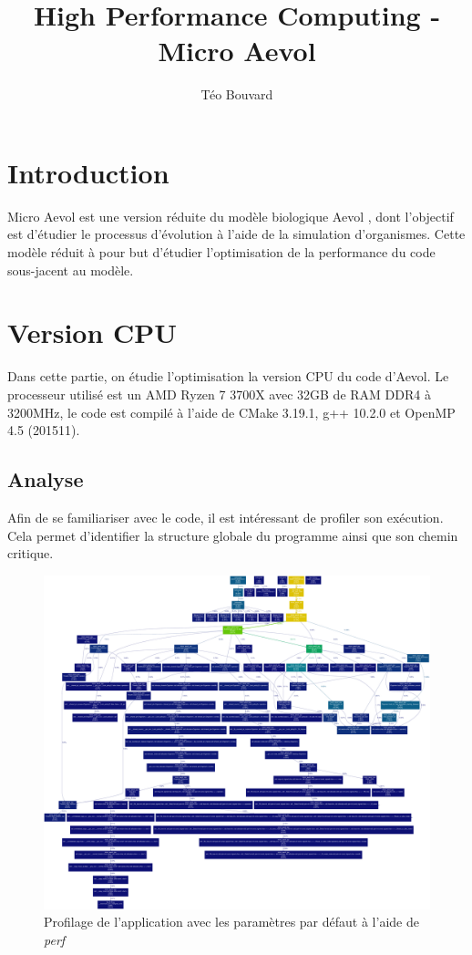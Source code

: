\documentclass[a4paper, 10pt, twoside]{article}
\begin{document}
\title{High Performance Computing - Micro Aevol}
\author{T\'eo Bouvard}
\maketitle

\section{Introduction}

Micro Aevol est une version réduite du modèle biologique Aevol \cite{aevol}, dont l'objectif est d'étudier le processus d'évolution à l'aide de la simulation d'organismes. Cette modèle réduit à pour but d'étudier l'optimisation de la performance du code sous-jacent au modèle.

\section{Version CPU}

Dans cette partie, on étudie l'optimisation la version CPU du code d'Aevol. Le processeur utilisé est un AMD Ryzen 7 3700X avec 32GB de RAM DDR4 à 3200MHz, le code est compilé à l'aide de CMake 3.19.1, g++ 10.2.0 et OpenMP 4.5 (201511).

\subsection{Analyse}

Afin de se familiariser avec le code, il est intéressant de profiler son exécution. Cela permet d'identifier la structure globale du programme ainsi que son chemin critique.

\begin{figure}
	\includegraphics[width=\linewidth]{img/init_profile_debug.pdf}
	\caption{Profilage de l'application avec les paramètres par défaut à l'aide de \textit{perf}}
\end{figure}
\end{document}

